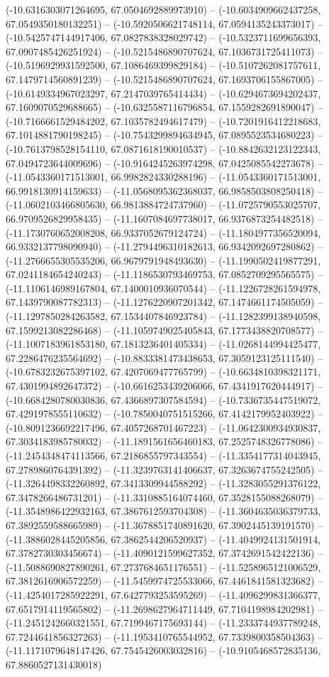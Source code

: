 (-10.6316303071264695, 67.0504692889973910) -- (-10.6034909662437258, 67.0549350180132251) -- (-10.5920506621748114, 67.0594135243373017) -- (-10.5425747144917406, 67.0827838328029742) -- (-10.5323711699656393, 67.0907485426251924) -- (-10.5215486890707624, 67.1036731725411073) -- (-10.5196929931592500, 67.1086469399829184) -- (-10.5107262081757611, 67.1479714560891239) -- (-10.5215486890707624, 67.1693706155867005) -- (-10.6149334967023297, 67.2147039765414434) -- (-10.6294673694202437, 67.1609070529688665) -- (-10.6325587116796854, 67.1559282691890047) -- (-10.7166661529484202, 67.1035782494617479) -- (-10.7201916412218683, 67.1014881790198245) -- (-10.7543299894634945, 67.0895523534680223) -- (-10.7613798528154110, 67.0871618190010537) -- (-10.8842632123122343, 67.0494723644009696) -- (-10.9164245263974298, 67.0425085542273678) -- (-11.0543360171513001, 66.9982824330288196) -- (-11.0543360171513001, 66.9918130914159633) -- (-11.0568095362368037, 66.9858503808250418) -- (-11.0602103466805630, 66.9813884724737960) -- (-11.0725790553025707, 66.9709526829958435) -- (-11.1607084697738017, 66.9376873254482518) -- (-11.1730760652008208, 66.9337052679124724) -- (-11.1804977356520094, 66.9332137798090940) -- (-11.2794496310182613, 66.9342092697280862) -- (-11.2766655305535206, 66.9679791948493630) -- (-11.1990502419877291, 67.0241184654240243) -- (-11.1186530793469753, 67.0852709295565575) -- (-11.1106146989167804, 67.1400010936070544) -- (-11.1226728261594978, 67.1439790087782313) -- (-11.1276220907201342, 67.1474661174505059) -- (-11.1297850284263582, 67.1534407846923784) -- (-11.1282399138940598, 67.1599213082286468) -- (-11.1059749025405843, 67.1773438820708577) -- (-11.1007183961853180, 67.1813236401405334) -- (-11.0268144994425477, 67.2286476235564692) -- (-10.8833381473438653, 67.3059123125111540) -- (-10.6783232675397102, 67.4207069477765799) -- (-10.6634810398321171, 67.4301994892647372) -- (-10.6616253439206066, 67.4341917620444917) -- (-10.6684280780030836, 67.4366897307584594) -- (-10.7336735447519072, 67.4291978555110632) -- (-10.7850040751515266, 67.4142179952403922) -- (-10.8091236692217496, 67.4057268701467223) -- (-11.0642300934930837, 67.3034183985780032) -- (-11.1891561656460183, 67.2525748326778086) -- (-11.2454348474113566, 67.2186855797343554) -- (-11.3354177314043945, 67.2789860764391392) -- (-11.3239763141406637, 67.3263674755242505) -- (-11.3264498332260892, 67.3413309944588292) -- (-11.3283055291376122, 67.3478266486731201) -- (-11.3310885164074460, 67.3528155088268079) -- (-11.3548986422932163, 67.3867612593704308) -- (-11.3604635036379733, 67.3892559588665989) -- (-11.3678851740891620, 67.3902445139191570) -- (-11.3886028445205856, 67.3862544206520937) -- (-11.4049924131501914, 67.3782730303456674) -- (-11.4090121599627352, 67.3742691542422136) -- (-11.5088690827890261, 67.2737684651176551) -- (-11.5258965121006529, 67.3812616906572259) -- (-11.5459974725533066, 67.4461841581323682) -- (-11.4254017285922291, 67.6427793253595269) -- (-11.4096299831366377, 67.6517914119565802) -- (-11.2698627964711449, 67.7104198984202981) -- (-11.2451242660321551, 67.7199467175693144) -- (-11.2333744937789248, 67.7244641856327263) -- (-11.1953410765544952, 67.7339800358504363) -- (-11.1171079648147426, 67.7545426003032816) -- (-10.9105468572835136, 67.8860527131430018) 